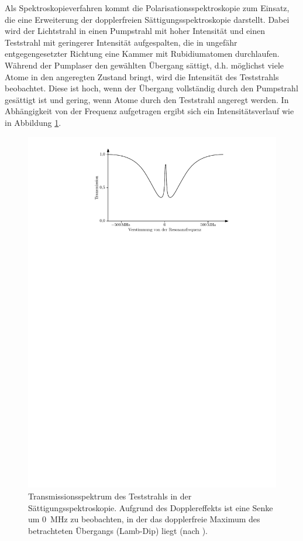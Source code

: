 \documentclass[11pt, a4paper]{article}
\numberwithin{equation}{section}
\begin{document}
Als Spektroskopieverfahren kommt die Polarisationsspektroskopie zum Einsatz, die eine Erweiterung der dopplerfreien Sättigungsspektroskopie darstellt.
Dabei wird der Lichtstrahl in einen Pumpstrahl mit hoher Intensität und einen Teststrahl mit geringerer Intensität aufgespalten, die in ungefähr entgegengesetzter Richtung eine Kammer mit Rubidiumatomen durchlaufen.
Während der Pumplaser den gewählten Übergang sättigt, d.h. möglichst viele Atome in den angeregten Zustand bringt, wird die Intensität des Teststrahls beobachtet.
Diese ist hoch, wenn der Übergang vollständig durch den Pumpstrahl gesättigt ist und gering, wenn Atome durch den Teststrahl angeregt werden.
In Abhängigkeit von der Frequenz aufgetragen ergibt sich ein Intensitätsverlauf wie in Abbildung \ref{fig:saturation}.
\begin{figure}[h]
	\centering
	\includegraphics[width=.8\textwidth]{./figures/theory/saturation}
	\caption{Transmissionsspektrum des Teststrahls in der Sättigungsspektroskopie. Aufgrund des Dopplereffekts ist eine Senke um \SI{0}{MHz} zu beobachten, in der das dopplerfreie Maximum des betrachteten Übergangs (Lamb-Dip) liegt (nach \cite{script}).}
	\label{fig:saturation}
\end{figure}
\end{document}
